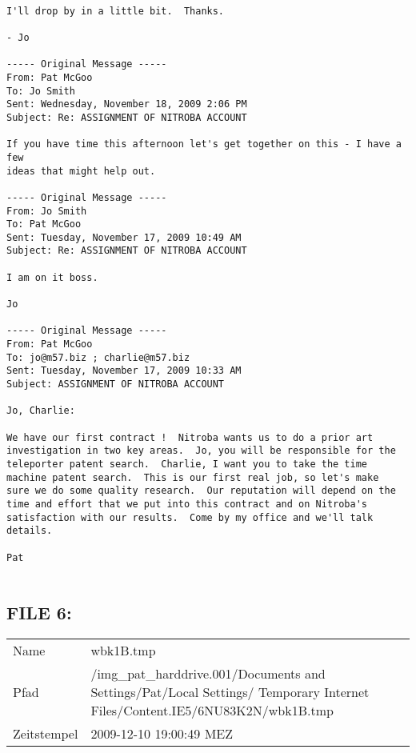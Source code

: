 \begin{lstlisting}

I'll drop by in a little bit.  Thanks.

- Jo

----- Original Message -----
From: Pat McGoo
To: Jo Smith
Sent: Wednesday, November 18, 2009 2:06 PM
Subject: Re: ASSIGNMENT OF NITROBA ACCOUNT

If you have time this afternoon let's get together on this - I have a few
ideas that might help out.

----- Original Message -----
From: Jo Smith
To: Pat McGoo
Sent: Tuesday, November 17, 2009 10:49 AM
Subject: Re: ASSIGNMENT OF NITROBA ACCOUNT

I am on it boss.

Jo

----- Original Message -----
From: Pat McGoo
To: jo@m57.biz ; charlie@m57.biz
Sent: Tuesday, November 17, 2009 10:33 AM
Subject: ASSIGNMENT OF NITROBA ACCOUNT

Jo, Charlie:

We have our first contract !  Nitroba wants us to do a prior art
investigation in two key areas.  Jo, you will be responsible for the
teleporter patent search.  Charlie, I want you to take the time
machine patent search.  This is our first real job, so let's make
sure we do some quality research.  Our reputation will depend on the
time and effort that we put into this contract and on Nitroba's
satisfaction with our results.  Come by my office and we'll talk
details.

Pat


\end{lstlisting}

\subsection{FILE 6:}	

\begin{table}[htb]
	\begin{tabular}{p{2cm} p{13.5cm}}
		Name & wbk1B.tmp\\
		Pfad & /img_pat_harddrive.001/Documents and Settings/Pat/Local Settings/ Temporary Internet Files/Content.IE5/6NU83K2N/wbk1B.tmp\\
		Zeitstempel & 2009-12-10 19:00:49 MEZ
	\end{tabular}
\end{table}	

